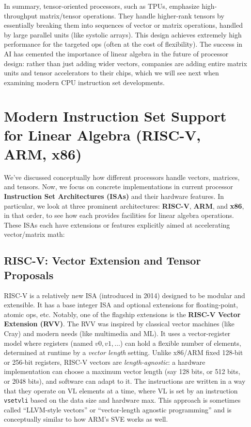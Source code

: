 In summary, tensor-oriented processors, such as TPUs, emphasize high-throughput matrix/tensor operations. They handle higher-rank tensors by essentially breaking them into sequences of vector or matrix operations, handled by large parallel units (like systolic arrays). This design achieves extremely high performance for the targeted ops (often at the cost of flexibility). The success in AI has cemented the importance of linear algebra in the future of processor design: rather than just adding wider vectors, companies are adding entire matrix units and tensor accelerators to their chips, which we will see next when examining modern CPU instruction set developments.

\newpage

\section{Modern Instruction Set Support for Linear Algebra (RISC-V, ARM, x86)}  
We’ve discussed conceptually how different processors handle vectors, matrices, and tensors. Now, we focus on concrete implementations in current processor \textbf{Instruction Set Architectures (ISAs)} and their hardware features. In particular, we look at three prominent architectures: \textbf{RISC-V}, \textbf{ARM}, and \textbf{x86}, in that order, to see how each provides facilities for linear algebra operations. These ISAs each have extensions or features explicitly aimed at accelerating vector/matrix math:

\subsection{RISC-V: Vector Extension and Tensor Proposals}  
RISC-V is a relatively new ISA (introduced in 2014) designed to be modular and extensible. It has a base integer ISA and optional extensions for floating-point, atomic ops, etc. Notably, one of the flagship extensions is the \textbf{RISC-V Vector Extension (RVV)}. The RVV was inspired by classical vector machines (like Cray) and modern needs (like multimedia and ML). It uses a vector-register model where registers (named $v0, v1, \dots$) can hold a flexible number of elements, determined at runtime by a \emph{vector length} setting. Unlike x86/ARM fixed 128-bit or 256-bit registers, RISC-V vectors are \emph{length-agnostic}: a hardware implementation can choose a maximum vector length (say 128 bits, or 512 bits, or 2048 bits), and software can adapt to it. The instructions are written in a way that they operate on $\text{VL}$ elements at a time, where VL is set by an instruction \texttt{vsetvli} based on the data size and hardware max. This approach is sometimes called “LLVM-style vectors” or “vector-length agnostic programming” and is conceptually similar to how ARM’s SVE works as well.

